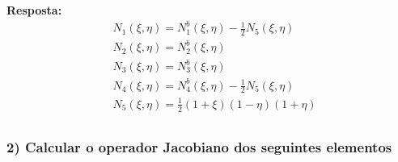 \color{blue}
\textbf{Resposta:}
\begin{equation}
	\begin{split}
		&N_1(\xi,\eta) = N^b_1(\xi,\eta) - \frac{1}{2}  N_5(\xi,\eta)\\
		&N_2(\xi,\eta) = N^b_2(\xi,\eta)\\
		&N_3(\xi,\eta) = N^b_3(\xi,\eta)\\
		&N_4(\xi,\eta) = N^b_4(\xi,\eta) - \frac{1}{2}  N_5(\xi,\eta)\\
		&N_5(\xi,\eta) = \frac{1}{2}(1+\xi)(1-\eta)(1+\eta)\\
	\end{split}
\end{equation}
\color{black}

\subsubsection{2) Calcular o operador Jacobiano dos seguintes elementos}

